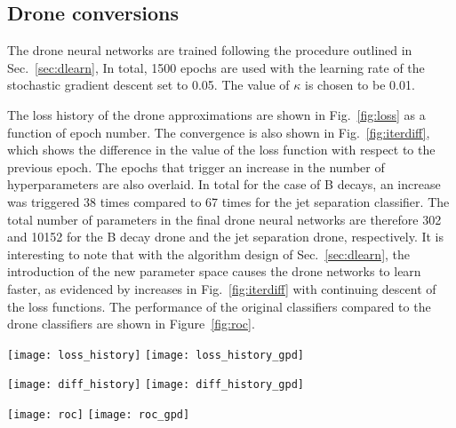\subsection{Drone conversions}

The drone neural networks are trained following the procedure outlined in Sec.~\ref{sec:dlearn},
In total, 1500 epochs are used with
the learning rate of the stochastic gradient descent set to 0.05.
The value of $\kappa$ is chosen to be 0.01.

The loss history of the drone approximations are shown in Fig.~\ref{fig:loss}
as a function of epoch number.
The convergence is also shown in Fig.~\ref{fig:iterdiff}, which shows
the difference in the value of the loss function with respect to the previous
epoch. The epochs that trigger an increase in the number of hyperparameters
are also overlaid.
In total for the case of B decays, an increase was triggered 38 times compared to 67 times for the
jet separation classifier. The total number
of parameters in the final drone neural networks are therefore 302 and 10152 for the B decay drone
and the jet separation drone, respectively. It is interesting
to note that with the algorithm design of Sec.~\ref{sec:dlearn}, the introduction
of the new parameter space causes the drone networks to learn faster, as evidenced by
increases in Fig.~\ref{fig:iterdiff} with continuing descent of the loss functions.
%
The performance of the original classifiers compared to the drone classifiers are shown in Figure~\ref{fig:roc}.
\begin{figure*}[t]
\centering
\texttt{[image: loss\_history]}
\texttt{[image: loss\_history\_gpd]}
\caption{\small
Convergence of the loss function during the drone training
  for the case of the B
  decay (left) and jet separation (right) examples.
}
\label{fig:loss}
\end{figure*}
\begin{figure*}[t]
\centering
\texttt{[image: diff\_history]}
\texttt{[image: diff\_history\_gpd]}
\caption{\small
Difference in the loss function with respect to the previous iteration
  for the case of the B
  decay (left) and jet separation (right) examples.
  The green triangles
depict the epoch number in which the number of hyperperameters was increased.
}
\label{fig:iterdiff}
\end{figure*}
\begin{figure*}[t]
\centering
\texttt{[image: roc]}
\texttt{[image: roc\_gpd]}
\caption{\small
  Signal efficiency versus background rejection of the original classifier (red) and drone
  approximation (blue)
  for the case of the B
  decay (left) and jet separation (right) examples.
}
\label{fig:roc}
\end{figure*}


